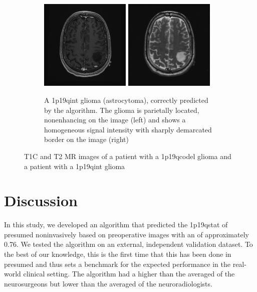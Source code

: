 \begin{figure}[htbp]
     \begin{subfigure}[b]{0.8\textwidth}
         \centering
         \includegraphics[width=0.475\textwidth]{Figures/LGG_625_intact_example_T1.png}
         \includegraphics[width=0.475\textwidth]{Figures/LGG_625_intact_example_T2.png}
         \caption{A \acl{1p19qint} glioma (astrocytoma), correctly predicted by the algorithm. The glioma is parietally located, nonenhancing on the   image (left) and shows a homogeneous signal intensity with sharply demarcated border on the   image (right)}\label{fig:LGG_1p19q_example_intact}
     \end{subfigure}

        \caption{\acrshort{T1C} and \acrshort{T2} \acrshort{MR} images of a patient with a \acl{1p19qcodel} glioma  and a patient with a \acl{1p19qint} glioma }\label{fig:LGG_1p19q_Examples}
\end{figure}



\section{Discussion}

In this study, we developed an algorithm that predicted the \acl{1p19qstat} of presumed  noninvasively based on preoperative  images with an  of approximately \num{0.76}.
We tested the algorithm on an external, independent validation dataset.
To the best of our knowledge, this is the first time that this has been done in presumed  and thus sets a benchmark for the expected performance in the real-world clinical setting.
The algorithm had a higher  than the averaged  of the neurosurgeons but lower than the averaged  of the neuroradiologists.

